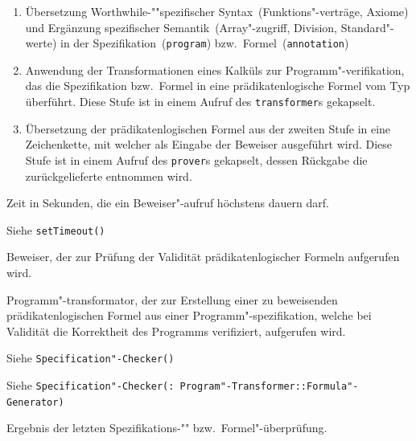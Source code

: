 \begin{enumerate}%

    \item Übersetzung Worthwhile-""spezifischer
    Syntax~(Funktions"-verträge, Axiome) und Ergänzung spezifischer
    Semantik~(Array"-zugriff, Division, Standard"-werte) in der
    Spezifikation~(\texttt{program}) bzw.\
    Formel~(\texttt{annotation})%

    \item Anwendung der Transformationen eines Kalküls zur
    Programm"-verifikation, das die Spezifikation bzw.\ Formel in eine
    prädikatenlogische Formel vom Typ \type{AST::Expression}
    überführt. Diese Stufe ist in einem Aufruf des
    \texttt{transformer}s gekapselt.%

    \item Übersetzung der prädikatenlogischen Formel aus der zweiten
    Stufe in eine Zeichenkette, mit welcher als Eingabe der Beweiser
    ausgeführt wird. Diese Stufe ist in einem Aufruf des
    \texttt{prover}s gekapselt, dessen Rückgabe die zurückgelieferte
    \type{Validity} entnommen wird.%

\end{enumerate}%

\begin{description}%

    Zeit in Sekunden, die ein Beweiser"-aufruf höchstens dauern darf.%

    Siehe \texttt{setTimeout()}%


    Beweiser, der zur Prüfung der Validität prädikatenlogischer
    Formeln aufgerufen wird.%


    Programm"-transformator, der zur Erstellung einer zu beweisenden
    prädikatenlogischen Formel aus einer Programm"-spezifikation,
    welche bei Validität die Korrektheit des Programms verifiziert,
    aufgerufen wird.%

    Siehe \texttt{Specification"-Checker()}%

    Siehe \texttt{Specification"-Checker(: Program"-Transformer::Formula"-Generator)}%


    Ergebnis der letzten Spezifikations-"" bzw.\ Formel"-überprüfung.%

\end{description}%

